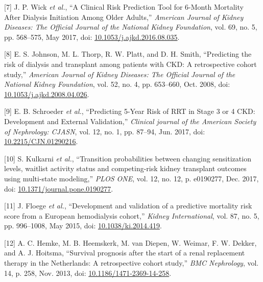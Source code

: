 \documentclass[
]{article}
\newenvironment{cslreferences}%
  {}%
  {\par}
\begin{document}
\begin{cslreferences}
\leavevmode\hypertarget{ref-wick_clinical_2017}{}%
{[}7{]} J. P. Wick \emph{et al.}, ``A Clinical Risk Prediction Tool for 6-Month Mortality After Dialysis Initiation Among Older Adults,'' \emph{American Journal of Kidney Diseases: The Official Journal of the National Kidney Foundation}, vol. 69, no. 5, pp. 568--575, May 2017, doi: \href{https://doi.org/10.1053/j.ajkd.2016.08.035}{10.1053/j.ajkd.2016.08.035}.

\leavevmode\hypertarget{ref-johnson_predicting_2008}{}%
{[}8{]} E. S. Johnson, M. L. Thorp, R. W. Platt, and D. H. Smith, ``Predicting the risk of dialysis and transplant among patients with CKD: A retrospective cohort study,'' \emph{American Journal of Kidney Diseases: The Official Journal of the National Kidney Foundation}, vol. 52, no. 4, pp. 653--660, Oct. 2008, doi: \href{https://doi.org/10.1053/j.ajkd.2008.04.026}{10.1053/j.ajkd.2008.04.026}.

\leavevmode\hypertarget{ref-schroeder_predicting_2017}{}%
{[}9{]} E. B. Schroeder \emph{et al.}, ``Predicting 5-Year Risk of RRT in Stage 3 or 4 CKD: Development and External Validation,'' \emph{Clinical journal of the American Society of Nephrology: CJASN}, vol. 12, no. 1, pp. 87--94, Jun. 2017, doi: \href{https://doi.org/10.2215/CJN.01290216}{10.2215/CJN.01290216}.

\leavevmode\hypertarget{ref-kulkarni_transition_2017}{}%
{[}10{]} S. Kulkarni \emph{et al.}, ``Transition probabilities between changing sensitization levels, waitlist activity status and competing-risk kidney transplant outcomes using multi-state modeling,'' \emph{PLOS ONE}, vol. 12, no. 12, p. e0190277, Dec. 2017, doi: \href{https://doi.org/10.1371/journal.pone.0190277}{10.1371/journal.pone.0190277}.

\leavevmode\hypertarget{ref-floege_development_2015}{}%
{[}11{]} J. Floege \emph{et al.}, ``Development and validation of a predictive mortality risk score from a European hemodialysis cohort,'' \emph{Kidney International}, vol. 87, no. 5, pp. 996--1008, May 2015, doi: \href{https://doi.org/10.1038/ki.2014.419}{10.1038/ki.2014.419}.

\leavevmode\hypertarget{ref-hemke_survival_2013}{}%
{[}12{]} A. C. Hemke, M. B. Heemskerk, M. van Diepen, W. Weimar, F. W. Dekker, and A. J. Hoitsma, ``Survival prognosis after the start of a renal replacement therapy in the Netherlands: A retrospective cohort study,'' \emph{BMC Nephrology}, vol. 14, p. 258, Nov. 2013, doi: \href{https://doi.org/10.1186/1471-2369-14-258}{10.1186/1471-2369-14-258}.


\end{cslreferences}
\end{document}
